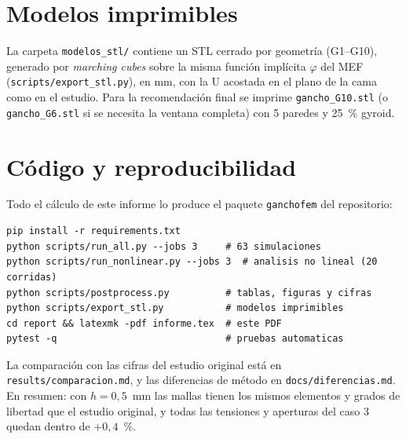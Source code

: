 \documentclass[11pt,a4paper]{article}
\begin{document}
\appendix
\section{Modelos imprimibles}
La carpeta \texttt{modelos\_stl/} contiene un STL cerrado por geometría (G1--G10), generado por \emph{marching cubes} sobre la misma función implícita $\varphi$ del MEF (\texttt{scripts/export\_stl.py}), en mm, con la U acostada en el plano de la cama como en el estudio. Para la recomendación final se imprime \texttt{gancho\_G10.stl} (o \texttt{gancho\_G6.stl} si se necesita la ventana completa) con 5 paredes y 25~\% gyroid.

\section{Código y reproducibilidad}\label{app:codigo}
Todo el cálculo de este informe lo produce el paquete \texttt{ganchofem} del repositorio:
\begin{lstlisting}
pip install -r requirements.txt
python scripts/run_all.py --jobs 3     # 63 simulaciones
python scripts/run_nonlinear.py --jobs 3  # analisis no lineal (20 corridas)
python scripts/postprocess.py          # tablas, figuras y cifras
python scripts/export_stl.py           # modelos imprimibles
cd report && latexmk -pdf informe.tex  # este PDF
pytest -q                              # pruebas automaticas
\end{lstlisting}
La comparación con las cifras del estudio original está en \texttt{results/comparacion.md}, y las diferencias de método en \texttt{docs/diferencias.md}. En resumen: con $h=0{,}5$~mm las mallas tienen los mismos elementos y grados de libertad que el estudio original, y todas las tensiones y aperturas del caso 3 quedan dentro de $+0{,}4$~\%.
\end{document}

